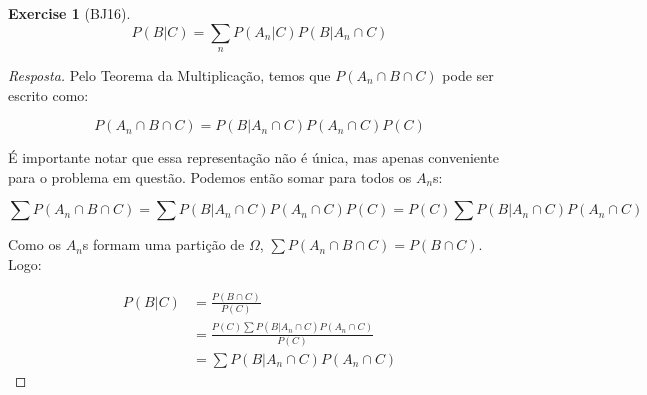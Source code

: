 \documentclass[
]{article}
\theoremstyle{definition}
\theoremstyle{definition}
\theoremstyle{definition}
\newtheorem{exercise}{Exercise}[section]
\theoremstyle{definition}
\theoremstyle{remark}
\begin{document}
\begin{exercise}[BJ16]
\begin{equation*}
P(B|C) = \sum_{n}P(A_{n}|C)P(B|A_{n} \cap C)
\end{equation*}

\begin{proof}[Resposta]
Pelo Teorema da Multiplicação, temos que \(P(A_{n} \cap B \cap C)\) pode ser escrito como:

\begin{equation*}
P(A_{n} \cap B \cap C) = P(B|A_{n} \cap C) P(A_{n} \cap C) P(C)
\end{equation*}

É importante notar que essa representação não é única, mas apenas conveniente para o problema em questão. Podemos então somar para todos os \(A_{n}\)s:

\begin{equation*}
\sum P(A_{n} \cap B \cap C) = \sum P(B|A_{n} \cap C) P(A_{n} \cap C) P(C) = P(C) \sum P(B|A_{n} \cap C) P(A_{n} \cap C)
\end{equation*}

Como os \(A_{n}\)s formam uma partição de \(\Omega\), \(\sum P(A_{n} \cap B \cap C) = P(B \cap C)\). Logo:

\begin{align*}
P(B|C) &= \frac{P(B \cap C)}{P(C)} \\
&= \frac{P(C) \sum P(B|A_{n} \cap C) P(A_{n} \cap C)}{P(C)} \\
&= \sum P(B|A_{n} \cap C) P(A_{n} \cap C)
\end{align*}
\end{proof}

\end{exercise}
\end{document}
